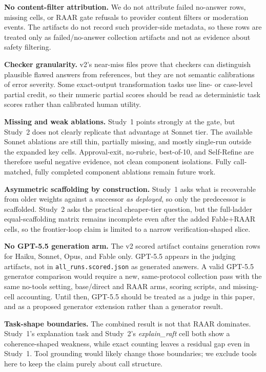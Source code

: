 \documentclass[journal]{IEEEtran}
\newcommand{\method}{RAAR}
\begin{document}
\textbf{No content-filter attribution.} We do not attribute failed no-answer
rows, missing cells, or RAAR gate refusals to provider content filters or
moderation events. The artifacts do not record such provider-side metadata, so
these rows are treated only as failed/no-answer collection artifacts and not as
evidence about safety filtering.

\textbf{Checker granularity.} v2's near-miss files prove that checkers can
distinguish plausible flawed answers from references, but they are not
semantic calibrations of error severity. Some exact-output transformation tasks
use line- or case-level partial credit, so their numeric partial scores should
be read as deterministic task scores rather than calibrated human utility.

\textbf{Missing and weak ablations.} Study~1 points strongly at the gate,
but Study~2 does not clearly replicate that advantage at Sonnet tier. The
available Sonnet ablations are still thin, partially missing, and mostly
single-run outside the expanded key cells. Approval-exit, no-rubric,
best-of-10, and Self-Refine are therefore useful negative evidence, not
clean component isolations. Fully call-matched, fully completed component
ablations remain future work.

\textbf{Asymmetric scaffolding by construction.} Study~1 asks what is
recoverable from older weights against a successor \emph{as deployed}, so
only the predecessor is scaffolded. Study~2 asks the practical cheaper-tier
question, but the full-ladder equal-scaffolding matrix remains incomplete
even after the added Fable+\method{} cells, so the frontier-loop claim is
limited to a narrow verification-shaped slice.

\textbf{No GPT-5.5 generation arm.} The v2 scored artifact contains
generation rows for Haiku, Sonnet, Opus, and Fable only. GPT-5.5 appears in
the judging artifacts, not in \texttt{all\_runs.scored.json} as generated
answers. A valid GPT-5.5
generator comparison would require a new, same-protocol collection pass with
the same no-tools setting, base/direct and \method{} arms, scoring scripts,
and missing-cell accounting. Until then, GPT-5.5 should be treated as a judge
in this paper, and as a proposed generator extension rather than a generator
result.

\textbf{Task-shape boundaries.} The combined result is not that \method{}
dominates. Study~1's explanation task and Study~2's \emph{explain\_raft}
cell both show a coherence-shaped weakness, while exact counting leaves a
residual gap even in Study~1. Tool grounding would likely change those
boundaries; we exclude tools here to keep the claim purely about call
structure.
\end{document}
